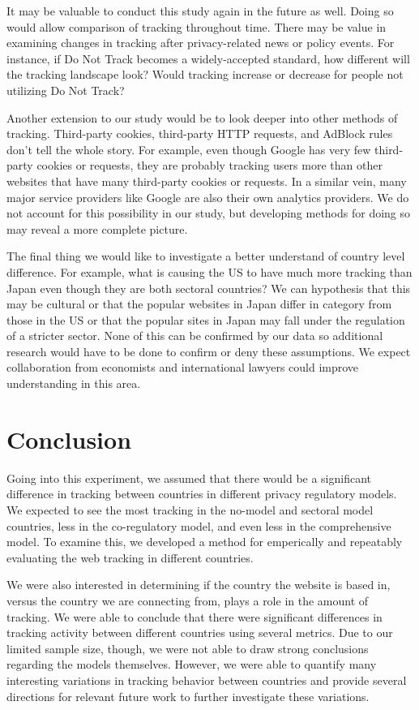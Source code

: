 \documentclass[conference]{IEEEtran}
\begin{document}
It may be valuable to conduct this study again in the future as well. Doing so would allow comparison of tracking throughout time. There may be value in examining changes in tracking after privacy-related news or policy events. For instance, if Do Not Track becomes a widely-accepted standard, how different will the tracking landscape look? Would tracking increase or decrease for people not utilizing Do Not Track?

Another extension to our study would be to look deeper into other methods of tracking. Third-party cookies, third-party HTTP requests, and AdBlock rules don't tell the whole story. For example, even though Google has very few third-party cookies or requests, they are probably tracking users more than other websites that have many third-party cookies or requests. In a similar vein, many major service providers like Google are also their own analytics providers. We do not account for this possibility in our study, but developing methods for doing so may reveal a more complete picture.

The final thing we would like to investigate a better understand of country level difference. For example, what is causing the US to have much more tracking than Japan even though they are both sectoral countries? We can hypothesis that this may be cultural or that the popular websites in Japan differ in category from those in the US or that the popular sites in Japan may fall under the regulation of a stricter sector. None of this can be confirmed by our data so additional research would have to be done to confirm or deny these assumptions.  We expect collaboration from economists and international lawyers could improve understanding in this area.

\section{Conclusion}
Going into this experiment, we assumed that there would be a significant difference in tracking between countries in different privacy regulatory models. We expected to see the most tracking in the no-model and sectoral model countries, less in the co-regulatory model, and even less in the comprehensive model. To examine this, we developed a method for emperically and repeatably evaluating the web tracking in different countries.  

We were also interested in determining if the country the website is based in, versus the country we are connecting from, plays a role in the amount of tracking. We were able to conclude that there were significant differences in tracking activity between different countries using several metrics. Due to our limited sample size, though, we were not able to draw strong conclusions regarding the models themselves. However, we were able to quantify many interesting variations in tracking behavior between countries and provide several directions for relevant future work to further investigate these variations.
\end{document}
